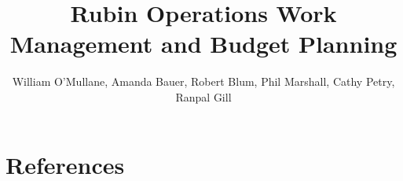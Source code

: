 \documentclass[DM,authoryear,toc]{lsstdoc}
\title{Rubin Operations Work Management and Budget Planning}
\author{%
William O'Mullane, Amanda Bauer, Robert Blum, Phil Marshall, Cathy Petry, Ranpal Gill
}
\date{\vcsDate}
\begin{document}
\maketitle



\appendix

\section{References} \label{sec:bib}
\renewcommand{\refname}{} %


%
\printglossaries


\end{document}
